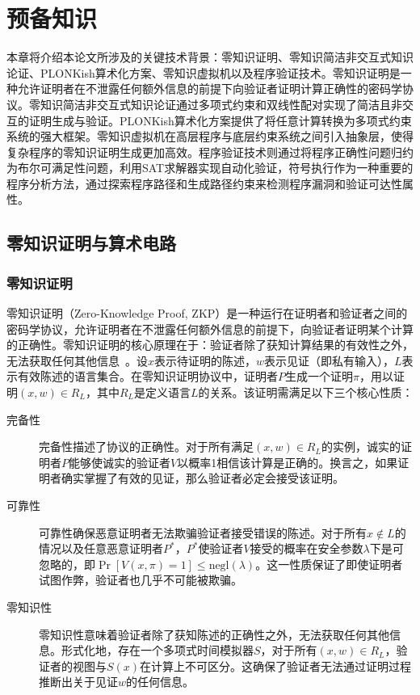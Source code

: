 
\chapter{预备知识}
本章将介绍本论文所涉及的关键技术背景：零知识证明、零知识简洁非交互式知识论证、PLONKish算术化方案、零知识虚拟机以及程序验证技术。零知识证明是一种允许证明者在不泄露任何额外信息的前提下向验证者证明计算正确性的密码学协议。零知识简洁非交互式知识论证通过多项式约束和双线性配对实现了简洁且非交互的证明生成与验证。PLONKish算术化方案提供了将任意计算转换为多项式约束系统的强大框架。零知识虚拟机在高层程序与底层约束系统之间引入抽象层，使得复杂程序的零知识证明生成更加高效。程序验证技术则通过将程序正确性问题归约为布尔可满足性问题，利用SAT求解器实现自动化验证，符号执行作为一种重要的程序分析方法，通过探索程序路径和生成路径约束来检测程序漏洞和验证可达性属性。

\section{零知识证明与算术电路}

\subsection{零知识证明}
零知识证明（Zero-Knowledge Proof, ZKP）是一种运行在证明者和验证者之间的密码学协议，允许证明者在不泄露任何额外信息的前提下，向验证者证明某个计算的正确性\cite{DBLP:journals/siamcomp/GoldwasserMR89}。零知识证明的核心原理在于：验证者除了获知计算结果的有效性之外，无法获取任何其他信息~\cite{cryptoeprint:2024/457}。设$x$表示待证明的陈述，$w$表示见证（即私有输入），$L$表示有效陈述的语言集合。在零知识证明协议中，证明者$P$生成一个证明$\pi$，用以证明$(x,w) \in R_{L}$，其中$R_{L}$是定义语言$L$的关系。该证明需满足以下三个核心性质\cite{DBLP:conf/crypto/GoldreichMW86}：

\begin{description}
    \item[完备性] 完备性描述了协议的正确性。对于所有满足$(x,w) \in R_{L}$的实例，诚实的证明者$P$能够使诚实的验证者$V$以概率1相信该计算是正确的。换言之，如果证明者确实掌握了有效的见证，那么验证者必定会接受该证明。
    
    \item[可靠性] 可靠性确保恶意证明者无法欺骗验证者接受错误的陈述。对于所有$x \notin L$的情况以及任意恶意证明者$P^{*}$，$P^{*}$使验证者$V$接受的概率在安全参数$\lambda$下是可忽略的，即$\Pr[V(x,\pi) = 1] \leq \text{negl}(\lambda)$。这一性质保证了即使证明者试图作弊，验证者也几乎不可能被欺骗。
    
    \item[零知识性] 零知识性意味着验证者除了获知陈述的正确性之外，无法获取任何其他信息。形式化地，存在一个多项式时间模拟器$S$，对于所有$(x,w) \in R_{L}$，验证者的视图与$S(x)$在计算上不可区分。这确保了验证者无法通过证明过程推断出关于见证$w$的任何信息。
\end{description}

